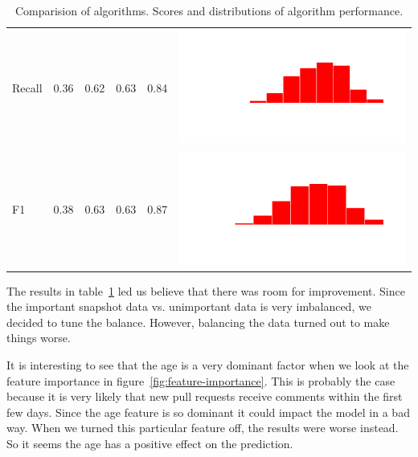 \documentclass[conference]{IEEEtran}
\begin{document}
\begin{table}
\begin{tabular}{lrrrrc}
    Recall & 0.36 & 0.62 & 0.63 & 0.84 & \includegraphics[scale = 0.1, clip = true, trim= 50px 60px 50px 60px]{../figs/hist-results/hist-RFrec.pdf} \\
    F1 & 0.38 & 0.63 & 0.63 & 0.87 & \includegraphics[scale = 0.1, clip = true, trim= 50px 60px 50px 60px]{../figs/hist-results/hist-RFf1.pdf} \\
    \hline
  \end{tabular}
  \caption[Comparision of algorithms]{Comparision of algorithms. Scores and distributions of algorithm performance.}
  \label{tab:alg-compare}
\end{table}

The results in table~\ref{tab:alg-compare} led us believe that there was room for improvement.
Since the important snapshot data vs. unimportant data is very imbalanced, we decided to tune the balance.
However, balancing the data turned out to make things worse.

It is interesting to see that the age is a very dominant factor when we look at the feature importance in figure~\ref{fig:feature-importance}.
This is probably the case because it is very likely that new pull requests receive comments within the first few days.
Since the age feature is so dominant it could impact the model in a bad way.
When we turned this particular feature off, the results were worse instead.
So it seems the age has a positive effect on the prediction.
\end{document}
